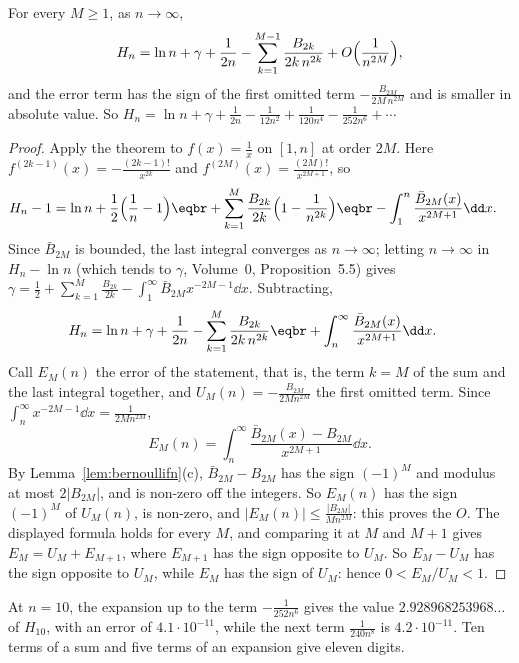 \begin{corollary}\label{cor:harmonic}
For every $M\ge1$, as $n\to\infty$,
\[
H_n=\ln n+\gamma+\frac1{2n}-\sum_{k=1}^{M-1}\frac{B_{2k}}{2k\,n^{2k}}+O\Bigl(\frac1{n^{2M}}\Bigr),
\]
and the error term has the sign of the first omitted term $-\frac{B_{2M}}{2M\,n^{2M}}$ and is smaller in absolute value. So $H_n=\ln n+\gamma+\frac1{2n}-\frac1{12n^2}+\frac1{120n^4}-\frac1{252n^6}+\cdots$
\end{corollary}
\begin{proof}
Apply the theorem to $f(x)=\frac1x$ on $[1,n]$ at order $2M$. Here $f^{(2k-1)}(x)=-\frac{(2k-1)!}{x^{2k}}$ and $f^{(2M)}(x)=\frac{(2M)!}{x^{2M+1}}$, so
\[
\begin{aligned}H_n-1&=\ln n+\frac12\Bigl(\frac1n-1\Bigr)\eqbr+\sum_{k=1}^M\frac{B_{2k}}{2k}\Bigl(1-\frac1{n^{2k}}\Bigr)\eqbr-\int_1^n\frac{\bar B_{2M}(x)}{x^{2M+1}}\dd x.\end{aligned}
\]
Since $\bar B_{2M}$ is bounded, the last integral converges as $n\to\infty$; letting $n\to\infty$ in $H_n-\ln n$ (which tends to $\gamma$, Volume~0,
Proposition~5.5) gives $\gamma=\frac12+\sum_{k=1}^M\frac{B_{2k}}{2k}-\int_1^\infty\bar B_{2M}x^{-2M-1}\dd x$. Subtracting,
\[
\begin{aligned}H_n&=\ln n+\gamma+\frac1{2n}-\sum_{k=1}^M\frac{B_{2k}}{2k\,n^{2k}}\eqbr+\int_n^\infty\frac{\bar B_{2M}(x)}{x^{2M+1}}\dd x.\end{aligned}
\]
Call $E_M(n)$ the error of the statement, that is, the term $k=M$ of the sum and the last integral together, and $U_M(n)=-\frac{B_{2M}}{2Mn^{2M}}$ the first
omitted term. Since $\int_n^\infty x^{-2M-1}\dd x=\frac1{2Mn^{2M}}$,
\[
E_M(n)=\int_n^\infty\frac{\bar B_{2M}(x)-B_{2M}}{x^{2M+1}}\dd x.
\]
By Lemma~\ref{lem:bernoullifn}(c), $\bar B_{2M}-B_{2M}$ has the sign $(-1)^M$ and modulus at most $2|B_{2M}|$, and is non-zero off the integers. So $E_M(n)$ has
the sign $(-1)^M$ of $U_M(n)$, is non-zero, and $|E_M(n)|\le\frac{|B_{2M}|}{Mn^{2M}}$: this proves the $O$. The displayed formula holds for every $M$, and comparing it
at $M$ and $M+1$ gives $E_M=U_M+E_{M+1}$, where $E_{M+1}$ has the sign opposite to $U_M$. So $E_M-U_M$ has the sign opposite to $U_M$, while $E_M$ has the sign
of $U_M$: hence $0<E_M/U_M<1$.
\end{proof}

At $n=10$, the expansion up to the term $-\frac1{252n^6}$ gives the value $2.928968253968\ldots$ of $H_{10}$, with an error of $4.1\cdot10^{-11}$, while the next term
$\frac1{240n^8}$ is $4.2\cdot10^{-11}$. Ten terms of a sum and five terms of an expansion give eleven digits.

